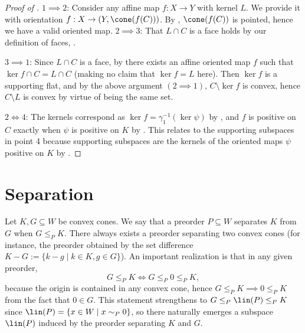 \documentclass{article}
\theoremstyle{plain}
\theoremstyle{definition}
\theoremstyle{remark}
\begin{document}
\begin{proof}[\hypertarget{loc:characterization_of_supporting_flats.proof}{}Proof of ]

$1 \implies 2$: Consider any affine map $f:X \to Y$ with kernel $L$. We provide it with orientation $f:X \to (Y, \cone(f(C)))$. By ,
$\cone(f(C))$ is pointed, hence we have a valid oriented map.
$2 \implies 3$: That $L \cap C$ is a face holds by our definition of faces, .

$3  \implies 1$: Since $L \cap C$ is a face, by  there exists an affine oriented map $f$ such that $\ker f \cap C = L \cap C$ (making no claim that $\ker f = L$ here). Then $\ker f$ is a supporting flat, and by the above argument $(2  \implies 1)$, $C \setminus \ker f$ is convex, hence $C\setminus L$ is convex by virtue of being the same set.

$2 \iff 4$: The kernels correspond as $\ker f = \gamma_1^{-1}(\ker \psi)$ by , and $f$ is positive on $C$ exactly when $\psi$ is positive on $K$ by . This relates to the supporting subspaces in point 4 because supporting subspaces are the kernels of the oriented maps $\psi$ positive on $K$ by . 
\end{proof}
\section{Separation}
\label{loc:body.separation}
Let $K, G \subseteq W$ be convex cones.
We say that a preorder $P \subseteq W$ separates $K$ from $G$ when
$G \le_{P} K$.
There always exists a preorder separating two convex cones (for instance, the
preorder obtained by the set difference $K-G:=\{ k - g \mid k \in K,g  \in G\}$). 
An important realization is that in any given preorder,
\begin{equation*}
G \le_{P} K  \iff  G \leq_{P} 0 \leq_{P} K,
\end{equation*}
because the origin is contained in any convex cone, hence $G \leq_{P} K  \implies 0 \leq_{P} K$ from the fact that $0 \in G$.
This statement strengthens to $G \leq_{P} \lin(P) \leq_{P} K$ since
$\lin(P) = \{ x  \in W \mid x \sim_{P} 0\}$, so there naturally
emerges a subspace $\lin(P)$ induced by the preorder separating $K$ and $G$.
\end{document}
